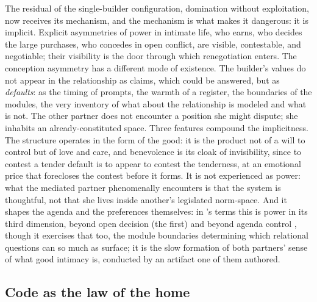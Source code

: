 \documentclass[11pt,a4paper]{article}
\begin{document}
The residual of the single-builder configuration, domination without exploitation, now receives its mechanism, and the mechanism is what makes it dangerous: it is implicit. Explicit asymmetries of power in intimate life, who earns, who decides the large purchases, who concedes in open conflict, are visible, contestable, and negotiable; their visibility is the door through which renegotiation enters. The conception asymmetry has a different mode of existence. The builder's values do not appear in the relationship as claims, which could be answered, but as \emph{defaults}: as the timing of prompts, the warmth of a register, the boundaries of the modules, the very inventory of what about the relationship is modeled and what is not. The other partner does not encounter a position she might dispute; she inhabits an already-constituted space. Three features compound the implicitness. The structure operates in the form of the good: it is the product not of a will to control but of love and care, and benevolence is its cloak of invisibility, since to contest a tender default is to appear to contest the tenderness, at an emotional price that forecloses the contest before it forms. It is not experienced as power: what the mediated partner phenomenally encounters is that the system is thoughtful, not that she lives inside another's legislated norm-space. And it shapes the agenda and the preferences themselves: in \textcite{lukes2021power}'s terms this is power in its third dimension, beyond open decision (the first) and beyond agenda control \parencite{bachrach1962two}, though it exercises that too, the module boundaries determining which relational questions can so much as surface; it is the slow formation of both partners' sense of what good intimacy is, conducted by an artifact one of them authored.

\subsection{Code as the law of the home}
\label{p02:sec:power-code}
\end{document}
